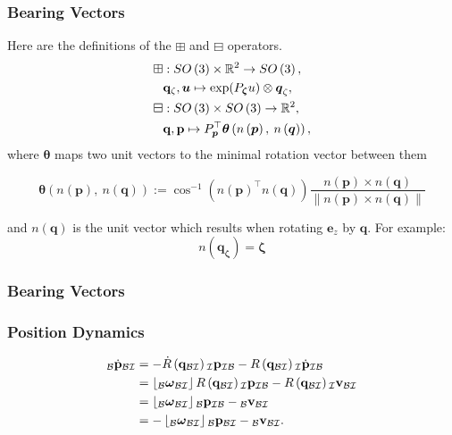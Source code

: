 \documentclass{beamer}
\begin{document}
\begin{frame}
\frametitle{Bearing Vectors}
 Here are the definitions of the $\boxplus$ and $\boxminus$
operators.
\begin{align}
\boxplus & :SO\left(3\right)\times\mathbb{R}^{2}\rightarrow SO\left(3\right),\\
 & {\bf q_{\zeta}},\boldsymbol{u}\mapsto\exp(P_{\boldsymbol{\zeta}}u)\otimes\boldsymbol{q}_{\zeta},\\
\boxminus & :SO\left(3\right)\times SO\left(3\right)\rightarrow\mathbb{R}^{2},\\
 & {\bf q},{\bf p}\mapsto P_{\boldsymbol{p}}^{\top}\boldsymbol{\theta}\left(n\left(\boldsymbol{p}\right),\:n\left(\boldsymbol{q}\right)\right),
\end{align}
where $\boldsymbol{\theta}$ maps two unit vectors to the minimal
rotation vector between them

\begin{equation}
\boldsymbol{\theta}\left(n\left(\boldsymbol{p}\right),\:n\left(\boldsymbol{q}\right)\right):=\cos^{-1}\left(n\left(\boldsymbol{p}\right)^{\top}n\left(\boldsymbol{q}\right)\right)\dfrac{n\left(\boldsymbol{p}\right)\times n\left(\boldsymbol{q}\right)}{\lVert n\left(\boldsymbol{p}\right)\times n\left(\boldsymbol{q}\right)\rVert}
\end{equation}


and $n\left(\boldsymbol{q}\right)$ is the unit vector which results
when rotating $\boldsymbol{e}_{z}$ by $\boldsymbol{q}$. For example:
\begin{equation}
n(\boldsymbol{q_{\zeta}})=\boldsymbol{\zeta}
\end{equation}
\end{frame}

\begin{frame}
\frametitle{Bearing Vectors}
\end{frame}


\begin{frame}
\frametitle{Position Dynamics}
\begin{align}
_{\mathcal{B}}\dot{{\bf p}}_{\mathcal{B}\mathcal{I}} & =-\dot{R}\left({\bf q}_{\mathcal{B}\mathcal{I}}\right){}_{\mathcal{I}}{\bf p}_{\mathcal{I}\mathcal{B}}-R\left({\bf q}_{\mathcal{B}\mathcal{I}}\right){}_{\mathcal{I}}\dot{{\bf p}}_{\mathcal{I}\mathcal{B}}\\
 & =\left\lfloor _{\mathcal{B}}\boldsymbol{\omega}_{\mathcal{B}\mathcal{I}}\right\rfloor R\left({\bf q}_{\mathcal{B}\mathcal{I}}\right){}_{\mathcal{I}}{\bf p}_{\mathcal{I}\mathcal{B}}-R\left({\bf q}_{\mathcal{B}\mathcal{I}}\right){}_{\mathcal{I}}{\bf v}_{\mathcal{B}\mathcal{I}}\\
 & =\left\lfloor _{\mathcal{B}}\boldsymbol{\omega}_{\mathcal{B}\mathcal{I}}\right\rfloor {}_{\mathcal{B}}{\bf p}_{\mathcal{I}\mathcal{B}}-{}_{\mathcal{B}}{\bf v}_{\mathcal{B}\mathcal{I}}\\
 & =-\left\lfloor _{\mathcal{B}}\boldsymbol{\omega}_{\mathcal{B}\mathcal{I}}\right\rfloor {}_{\mathcal{B}}{\bf p}_{\mathcal{B}\mathcal{I}}-{}_{\mathcal{B}}{\bf v}_{\mathcal{B}\mathcal{I}}.
\end{align}
\end{frame}
\end{document}
